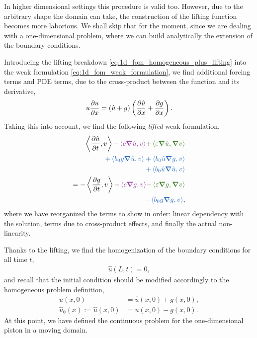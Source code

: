 \documentclass[../../thesis.tex]{subfiles}
\newcommand{\inner}[2]{\left<#1, #2\right>}
\begin{document}
In higher dimensional settings this procedure is valid too. 
However, due to the arbitrary shape the domain can take, the construction of the lifting function becomes more laborious.
We shall skip that for the moment, since we are dealing with a one-dimensional problem, where we can build analytically the extension of the boundary conditions. 

Introducing the lifting breakdown \eqref{eq:1d_fom_homogeneous_plus_lifting} into the weak formulation \eqref{eq:1d_fom_weak_formulation},
we find additional forcing terms and PDE terms, due to the cross-product between the function and its derivative, 
\begin{equation}
    u \pdv{u}{x} = \left(\hat{u} + g\right)\left(\pdv{\hat{u}}{x} + \pdv{g}{x}\right).
\end{equation}
Taking this into account, we find the following \textit{lifted} weak formulation,
\begin{subequations}
    \label{eq:1d_fom_weak_formulation_homogeneous}
    \begin{align}
        \inner{\frac{\partial \hat{u}}{\partial t}}{v} \textcolor{Purple}{- \inner{c \grad \hat{u}}{v}} \textcolor{OliveGreen}{+ \inner{\varepsilon \grad \hat{u}}{\grad v}} \nonumber\\
        \textcolor{NavyBlue}{+ \inner{b_0 g \grad \hat{u}}{v}
        + \inner{b_0 \hat{u} \grad g}{v}} \nonumber\\
        \textcolor{NavyBlue}{+ \inner{b_0 \hat{u} \grad \hat{u}}{v}} \nonumber\\
        = 
        - \inner{\frac{\partial g}{\partial t}}{v} \textcolor{Purple}{+ \inner{c \grad g}{v}} \textcolor{OliveGreen}{- \inner{\varepsilon \grad g}{\grad v}} \nonumber\\ 
        \textcolor{NavyBlue}{- \inner{b_0 g \grad g}{v}},
    \end{align}
\end{subequations}
where we have reorganized the terms to show in order: linear dependency with the solution, terms due to cross-product effects, and finally the actual non-linearity.

Thanks to the lifting, we find the homogenization of the boundary conditions for all time $t$,
\begin{subequations}
    \begin{align}
        \hat{u}(L, t) = 0,
    \end{align}
\end{subequations}
and recall that the initial condition should be modified accordingly to the homogeneous problem definition, 
\begin{subequations}
    \begin{align}
    u(x,0) &= \hat{u}(x,0) + g(x,0), \\ 
    \hat{u}_0(x):= \hat{u}(x,0) &= u(x,0) - g(x,0). 
    \end{align}
\end{subequations}
At this point, we have defined the continuous problem for the one-dimensional piston in a moving domain.
\end{document}
